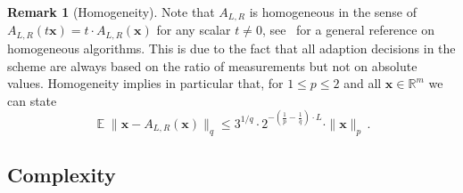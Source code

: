 \documentclass[12pt]{article}
\theoremstyle{plain}
\theoremstyle{definition}
\newtheorem{remark}[theorem]{Remark}
\newcommand{\expect}{\operatorname{\mathbb{E}}}
\renewcommand{\vec}{\boldsymbol}
\newcommand{\R}{{\mathbb R}}
\begin{document}
\begin{remark}[Homogeneity] \label{rem:homogen}
    Note that $A_{L,R}$ is homogeneous in the sense of
    $A_{L,R}(t \vec{x}) = t \cdot A_{L,R}(\vec{x})$ for any scalar $t \neq 0$,
    see~\cite{KK24} for a general reference on homogeneous algorithms.
    This is due to the fact that all adaption decisions in the scheme are always based on the ratio of measurements
    but not on absolute values.
    Homogeneity implies in particular that, for $1 \leq p \leq 2$ and all $\vec{x} \in \R^m$ we can state
    \begin{equation*}
        \expect \|\vec{x} - A_{L,R}(\vec{x})\|_q
            \leq 3^{1/q} \cdot 2^{-\left(\frac{1}{p} - \frac{1}{q}\right) \cdot L} \cdot \|\vec{x}\|_p \,.
    \end{equation*}
\end{remark}

\subsection{Complexity}
\label{sec:complexity}
\end{document}
